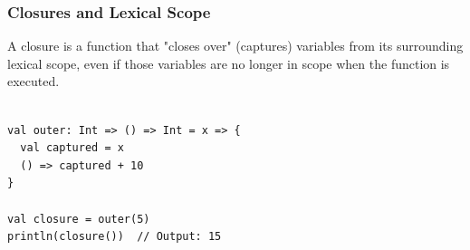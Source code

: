 \documentclass{beamer}
\begin{document}
\begin{frame}[fragile]
\frametitle{Closures and Lexical Scope}

A closure is a function that "closes over" (captures) variables from its surrounding lexical scope, even if those variables are no longer in scope when the function is executed.

\begin{lstlisting}[style=scalaStyle]

val outer: Int => () => Int = x => {
  val captured = x
  () => captured + 10
}

val closure = outer(5)
println(closure())  // Output: 15

\end{lstlisting}
\end{frame}
\end{document}
